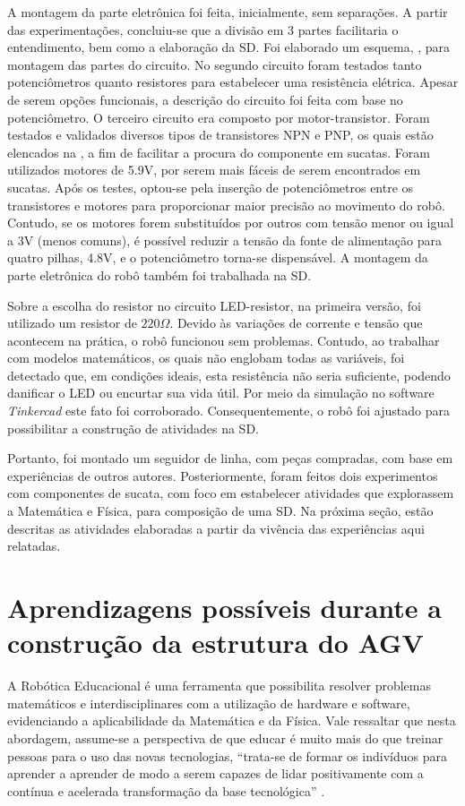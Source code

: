 \documentclass{textolivre-html}
\begin{document}
A montagem da parte eletrônica foi feita, inicialmente, sem separações. A
partir das experimentações, concluiu-se que a divisão em 3 partes facilitaria o
entendimento, bem como a elaboração da SD. Foi elaborado um esquema, ,
para montagem das partes do circuito. No segundo circuito foram testados tanto
potenciômetros quanto resistores para estabelecer uma resistência elétrica.
Apesar de serem opções funcionais, a descrição do circuito foi feita com base
no potenciômetro. O terceiro circuito era composto por motor-transistor. Foram
testados e validados diversos tipos de transistores NPN e PNP, os quais estão
elencados na , a fim de facilitar a procura do componente em sucatas.
Foram utilizados motores de 5.9V, por serem mais fáceis de serem encontrados em
sucatas. Após os testes, optou-se pela inserção de potenciômetros entre os
transistores e motores para proporcionar maior precisão ao movimento do robô.
Contudo, se os motores forem substituídos por outros com tensão menor ou igual
a 3V (menos comuns), é possível reduzir a tensão da fonte de alimentação para
quatro pilhas, 4.8V, e o potenciômetro torna-se dispensável. A montagem da
parte eletrônica do robô também foi trabalhada na SD.

Sobre a escolha do resistor no circuito LED-resistor, na primeira versão, foi
utilizado um resistor de $220\Omega$. Devido às variações de corrente e tensão que
acontecem na prática, o robô funcionou sem problemas. Contudo, ao trabalhar com
modelos matemáticos, os quais não englobam todas as variáveis, foi detectado
que, em condições ideais, esta resistência não seria suficiente, podendo
danificar o LED ou encurtar sua vida útil. Por meio da simulação no software
\emph{Tinkercad} este fato foi corroborado. Consequentemente, o robô foi ajustado para
possibilitar a construção de atividades na SD.

Portanto, foi montado um seguidor de linha, com peças compradas, com base em
experiências de outros autores. Posteriormente, foram feitos dois experimentos
com componentes de sucata, com foco em estabelecer atividades que explorassem a
Matemática e Física, para composição de uma SD. Na próxima seção, estão
descritas as atividades elaboradas a partir da vivência das experiências aqui
relatadas.

\section{Aprendizagens possíveis durante a construção da estrutura do AGV}\label{sec-aprendizagens}
A Robótica Educacional é uma ferramenta que possibilita resolver problemas
matemáticos e interdisciplinares com a utilização de hardware e software,
evidenciando a aplicabilidade da Matemática e da Física. Vale ressaltar que
nesta abordagem, assume-se a perspectiva de que educar é muito mais do que
treinar pessoas para o uso das novas tecnologias, “trata-se de formar os
indivíduos para aprender a aprender de modo a serem capazes de lidar
positivamente com a contínua e acelerada transformação da base tecnológica”
\cite[p. 45]{brasil2000}.
\end{document}
